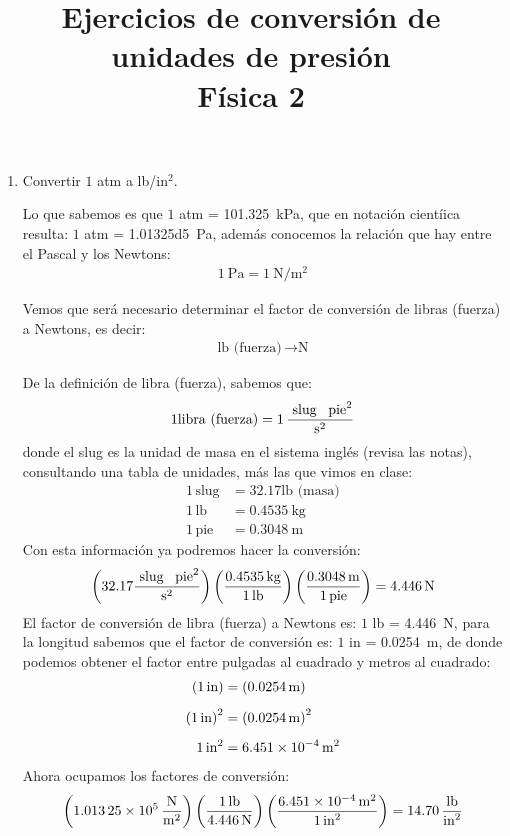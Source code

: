 \documentclass[14pt]{extarticle}
\title{\vspace*{-2cm} Ejercicios de conversión de unidades de presión \\ Física 2\vspace{-5ex}}
\date{}
\begin{document}
\maketitle

\begin{enumerate}
\item Convertir $1$ atm a lb/in$^{2}$.

Lo que sabemos es que $1$ atm = \SI{101.325}{\kilo\pascal}, que en notación cientíica resulta: $1$ atm = \SI{1.01325d5}{\pascal}, además conocemos la relación que hay entre el Pascal y los Newtons:
\begin{align*}
\SI{1}{\pascal} = \SI{1}{\newton\per\square\meter} 
\end{align*}

Vemos que será necesario determinar el factor de conversión de libras (fuerza) a Newtons, es decir:
\begin{align*}
\text{lb (fuerza)} \, \rightarrow \unit{\newton}
\end{align*}

De la definición de libra (fuerza), sabemos que:
\begin{align*}
1 \text{libra (fuerza)} = 1 \, \dfrac{\text{ slug \, pie}^{2}}{\unit{\square\second}}
\end{align*}
donde el slug es la unidad de masa en el sistema inglés (revisa las notas), consultando una tabla de unidades, más las que vimos en clase:
\begin{align*}
1 \, \text{slug} &= 32.17 \text{lb (masa)} \\[0.5em]
1 \, \text{lb} &= \SI{0.4535}{\kilo\gram} \\[0.5em]
1 \, \text{pie} &= \SI{0.3048}{\meter}
\end{align*}
Con esta información ya podremos hacer la conversión:
\begin{align*}
\left( 32.17 \dfrac{\text{ slug \, pie}^{2}}{\unit{\square\second}} \right) \left(  \dfrac{\SI{0.4535}{\kilo\gram}}{1 \, \text{lb}} \right) \left( \dfrac{\SI{0.3048}{\meter}}{1 \, \text{pie}} \right) = \SI{4.446}{\newton}
\end{align*}
El factor de conversión de libra (fuerza) a Newtons es: $1$ lb = \SI{4.446}{\newton}, para la longitud sabemos que el factor de conversión es: $1$ in = \SI{0.0254}{\meter}, de donde podemos obtener el factor entre pulgadas al cuadrado y metros al cuadrado: 
\begin{align*}
\left( 1 \, \text{in} \right) &= \left(\SI{0.0254}{\meter} \right) \\[0.5em]
\left( 1 \, \text{in} \right)^{2} &= \left( \SI{0.0254}{\meter} \right)^{2} \\[0.5em]
1 \, \text{in}^{2} &= \SI{6.451d-4}{\square\meter}
\end{align*}
Ahora ocupamos los factores de conversión:
\begin{align*}
\left( \SI{1.01325d5}{\newton\per\square\meter} \right) \left( \dfrac{1 \, \text{lb}}{\SI{4.446}{\newton}} \right) \left( \dfrac{\SI{6.451d-4}{\square\meter}}{1 \, \text{in}^{2}} \right) = 14.70 \, \dfrac{\text{lb}}{\text{in}^{2}}
\end{align*}


\end{enumerate}
\end{document}
